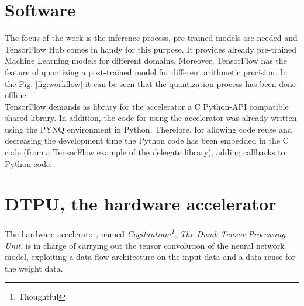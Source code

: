 \section{Software}

The focus of the work is the inference process, pre-trained models are needed and TensorFlow Hub comes in handy for this purpose. It provides already pre-trained Machine Learning models for different domains. Moreover, TensorFlow has the feature of quantizing a post-trained model for different arithmetic precision. In the Fig. \ref{fig:workflow} it can be seen that the quantization process has been done offline.\\
TensorFlow demands as library for the accelerator a C Python-API compatible shared library. In addition, the code for using the accelerator was already written using the PYNQ environment in Python. Therefore, for allowing code reuse and decreasing the development time the Python code has been embedded in the C code (from a TensorFlow example of the delegate library), adding callbacks to Python code.
\section{DTPU, the hardware accelerator}
The hardware accelerator, named \textit{Cogitantium\footnote{Thoughtful}, The Dumb Tensor Processing Unit}, is in charge of carrying out the tensor convolution of the neural network model, exploiting a data-flow architecture on the input data and a data reuse for the weight data.

